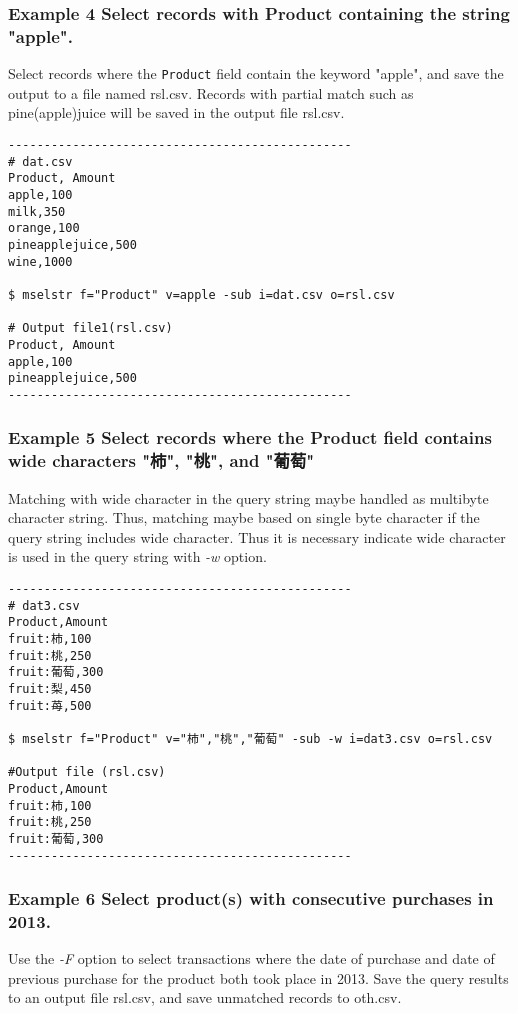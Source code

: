 \documentclass[a4paper]{jarticle}
\begin{document}
\subsubsection*{Example 4 Select records with Product containing the string "apple". }
Select records where the \verb|Product| field contain the keyword "apple", and save the output to a file named  rsl.csv. Records with partial match such as pine(apple)juice will be saved in the output file rsl.csv.

\begin{verbatim}
------------------------------------------------
# dat.csv
Product, Amount
apple,100
milk,350
orange,100
pineapplejuice,500
wine,1000

$ mselstr f="Product" v=apple -sub i=dat.csv o=rsl.csv

# Output file1(rsl.csv)
Product, Amount
apple,100
pineapplejuice,500
------------------------------------------------
\end{verbatim}

\subsubsection*{Example 5 Select records where the Product field contains wide characters  "柿", "桃", and "葡萄" }

Matching with wide character in the query string maybe handled as multibyte character string. Thus,  matching maybe based on single byte character if the query string includes wide character. Thus it is necessary indicate wide character is used in the query string with \emph{-w} option. 

\begin{verbatim}
------------------------------------------------
# dat3.csv
Product,Amount
fruit:柿,100
fruit:桃,250
fruit:葡萄,300
fruit:梨,450
fruit:苺,500

$ mselstr f="Product" v="柿","桃","葡萄" -sub -w i=dat3.csv o=rsl.csv

#Output file (rsl.csv)
Product,Amount
fruit:柿,100
fruit:桃,250
fruit:葡萄,300
------------------------------------------------
\end{verbatim}

\subsubsection*{Example 6 Select product(s) with consecutive purchases in 2013. }
Use the \emph{-F} option to select transactions where the date of purchase and date of previous purchase for the product both took place in 2013.  Save the query results to an output file rsl.csv, and save unmatched records to oth.csv. 
\end{document}
